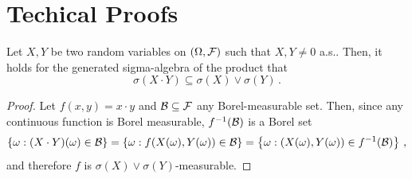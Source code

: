 \section{Techical Proofs}\label{apx:technical_proofs_ggBm}
\begin{lemma}\label{lem:sigma_prod}

Let $X, Y$ be two random variables on $(\Omega, \mathcal{F})$ such that $X, Y \neq 0$ a.s.. Then, it holds for the generated sigma-algebra of the product that
$$
\sigma(X\cdot Y) \subseteq \sigma(X)\lor\sigma(Y)\,.
$$
\end{lemma}
\begin{proof}
Let $f(x, y)=x\cdot y$ and $\mathcal{B}\subseteq \mathcal{F}$ any Borel-measurable set. Then, since any continuous function is Borel measurable, $f^{-1}(\mathcal{B})$ is a Borel set
\[
\{\omega:(X\cdot Y)(\omega) \in \mathcal{B}\}=\{\omega: f(X(\omega), Y(\omega)) \in \mathcal{B}\}=\left\{\omega:(X(\omega), Y(\omega)) \in f^{-1}(\mathcal{B})\right\}\,,
\]
and therefore $f$ is $\sigma(X)\lor\sigma(Y)$-measurable.
\end{proof}

